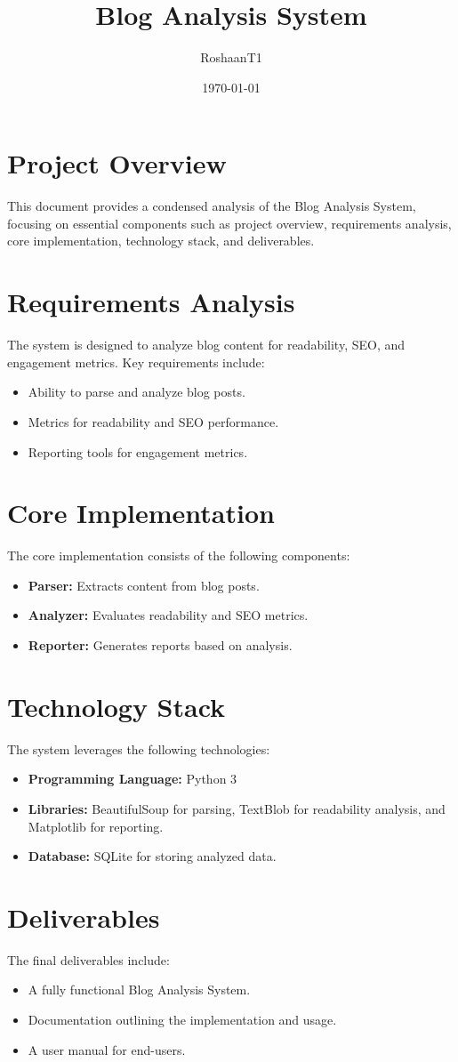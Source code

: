 \documentclass{article}
\title{Blog Analysis System}
\author{RoshaanT1}
\date{\today}
\begin{document}
\maketitle

\section{Project Overview}
This document provides a condensed analysis of the Blog Analysis System, focusing on essential components such as project overview, requirements analysis, core implementation, technology stack, and deliverables.

\section{Requirements Analysis}
The system is designed to analyze blog content for readability, SEO, and engagement metrics. Key requirements include:
\begin{itemize}
  \item Ability to parse and analyze blog posts.
  \item Metrics for readability and SEO performance.
  \item Reporting tools for engagement metrics.
\end{itemize}

\section{Core Implementation}
The core implementation consists of the following components:
\begin{itemize}
  \item \textbf{Parser:} Extracts content from blog posts.
  \item \textbf{Analyzer:} Evaluates readability and SEO metrics.
  \item \textbf{Reporter:} Generates reports based on analysis.
\end{itemize}

\section{Technology Stack}
The system leverages the following technologies:
\begin{itemize}
  \item \textbf{Programming Language:} Python 3
  \item \textbf{Libraries:} BeautifulSoup for parsing, TextBlob for readability analysis, and Matplotlib for reporting.
  \item \textbf{Database:} SQLite for storing analyzed data.
\end{itemize}

\section{Deliverables}
The final deliverables include:
\begin{itemize}
  \item A fully functional Blog Analysis System.
  \item Documentation outlining the implementation and usage.
  \item A user manual for end-users.
\end{itemize}
\end{document}
